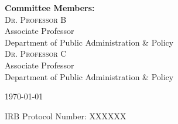 \begin{titlepage}
	{\bfseries Committee Members:} \\
	\vspace{2mm}
	\textsc{Dr. Professor B} \\
	Associate Professor \\
	Department of Public Administration \& Policy \\
	\vspace{2mm}
	\textsc{Dr. Professor C} \\
	Associate Professor \\
	Department of Public Administration \& Policy \\
	\vfill
	{\large \today \par}
	{\footnotesize IRB Protocol Number: XXXXXX}
\end{titlepage}